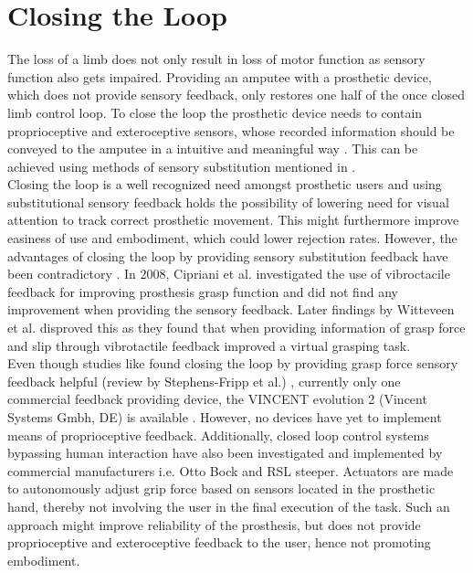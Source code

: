 \section{Closing the Loop}

The loss of a limb does not only result in loss of motor function as sensory function also gets impaired. Providing an amputee with a prosthetic device, which does not provide sensory feedback, only restores one half of the once closed limb control loop. To close the loop the prosthetic device needs to contain proprioceptive and exteroceptive sensors, whose recorded information should be conveyed to the amputee in a intuitive and meaningful way \cite{Markovic2018}. This can be achieved using methods of sensory substitution mentioned in . \\
Closing the loop is a well recognized need amongst prosthetic users and using substitutional sensory feedback holds the possibility of lowering need for visual attention to track correct prosthetic movement. This might furthermore improve easiness of use and embodiment, which could lower rejection rates. \cite{Strbac2016} However, the advantages of closing the loop by providing sensory substitution feedback have been contradictory \cite{Jorgovanovic2014}. In 2008, Cipriani et al. \cite{Cipriani2008} investigated the use of vibroctacile feedback for improving prosthesis grasp function and did not find any improvement when providing the sensory feedback. Later findings by Witteveen et al. \cite{Witteveen2012} disproved this as they found that when providing information of grasp force and slip through vibrotactile feedback improved a virtual grasping task. \\
Even though studies like \cite{Jorgovanovic2014,Witteveen2012} found closing the loop by providing grasp force sensory feedback helpful (review by Stephens-Fripp et al.) \cite{Stephens-Fripp2018}, currently only one commercial feedback providing device, the VINCENT evolution 2 (Vincent Systems Gmbh, DE) is available \cite{Systems2005}. However, no devices have yet to implement means of proprioceptive feedback. Additionally, closed loop control systems bypassing human interaction have also been investigated and implemented by commercial manufacturers i.e. Otto Bock and RSL steeper. Actuators are made to autonomously adjust grip force based on sensors located in the prosthetic hand, thereby not involving the user in the final execution of the task. \cite{Xu2016} Such an approach might improve reliability of the prosthesis, but does not provide proprioceptive and exteroceptive feedback to the user, hence not promoting embodiment.  




